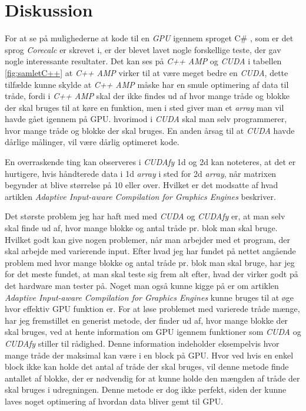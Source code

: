\section{Diskussion}
\label{DIS}
For at se på mulighederne at kode til en \textit{GPU} igennem sproget C\# , som er det sprog \textit{Corecalc} er skrevet i, er der blevet lavet nogle forskellige teste, der gav nogle interessante resultater. Det kan ses på \textit{C++ AMP} og \textit{CUDA} i tabellen \ref{fig:samletC++} at \textit{C++ AMP} virker til at være meget bedre en \textit{CUDA}, dette tilfælde kunne skylde at \textit{C++ AMP} måske har en smule optimering af data til tråde, fordi i \textit{C++ AMP} skal der ikke findes ud af hvor mange tråde og blokke der skal bruges til at køre en funktion, men i sted giver man et \textit{array} man vil havde gået igennem på GPU. hvorimod i \textit{CUDA} skal man selv programmerer, hvor mange tråde og blokke der skal bruges. En anden årsag til at \textit{CUDA} havde dårlige målinger, vil være dårlig optimeret kode.

En overraskende ting kan observeres i \textit{CUDAfy} 1d og 2d kan noteteres, at det er hurtigere, hvis håndterede data i 1d \textit{array} i sted for 2d \textit{array}, når matrixen begynder at blive størrelse på 10 eller over. Hvilket er det modsatte af hvad artiklen \textit{Adaptive Input-aware Compilation for Graphics Engines}\cite{samadi2012adaptive} beskriver.

Det største problem jeg har haft med med \textit{CUDA} og \textit{CUDAfy} er, at man selv skal finde ud af, hvor mange blokke og antal tråde pr. blok man skal bruge. Hvilket godt kan give nogen problemer, når man arbejder med et program, der skal arbejde med varierende input. Efter hvad jeg har fundet på nettet angående problem med hvor mange blokke og antal tråde pr. blok man skal bruge, har jeg for det meste fundet, at man skal teste sig frem alt efter, hvad der virker godt på det hardware man tester på. Noget man også kunne kigge på er om artiklen \textit{Adaptive Input-aware Compilation for Graphics Engines}\cite{samadi2012adaptive} kunne bruges til at øge hvor effektiv GPU funktion er. For at løse problemet med varierede tråde mænge, har jeg fremstillet en generist metode, der finder ud af, hvor mange blokke der skal bruges, ved at hente information om GPU igennem funktioner som \textit{CUDA} og \textit{CUDAfy} stiller til rådighed. Denne information indeholder eksempelvis hvor mange tråde der maksimal kan være i en block på GPU. Hvor ved hvis en enkel block ikke kan holde det antal af tråde der skal bruges, vil denne metode finde antallet af blokke, der er nødvendig for at kunne holde den mængden af tråde der skal bruges i udregningen. Denne metode er dog ikke perfekt, siden der kunne laves noget optimering af hvordan data bliver gemt til GPU. 

